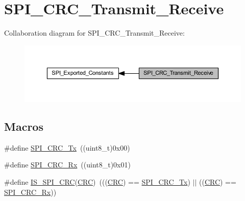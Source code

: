 \hypertarget{group___s_p_i___c_r_c___transmit___receive}{}\section{S\+P\+I\+\_\+\+C\+R\+C\+\_\+\+Transmit\+\_\+\+Receive}
\label{group___s_p_i___c_r_c___transmit___receive}
Collaboration diagram for S\+P\+I\+\_\+\+C\+R\+C\+\_\+\+Transmit\+\_\+\+Receive\+:
\nopagebreak
\begin{figure}[H]
\begin{center}
\leavevmode
\includegraphics[width=350pt]{group___s_p_i___c_r_c___transmit___receive}
\end{center}
\end{figure}
\subsection*{Macros}
\begin{DoxyCompactItemize}
\item 
\#define \hyperlink{group___s_p_i___c_r_c___transmit___receive_ga7b5cd97c9323e491b628fd3a7be9e133}{S\+P\+I\+\_\+\+C\+R\+C\+\_\+\+Tx}~((uint8\+\_\+t)0x00)
\item 
\#define \hyperlink{group___s_p_i___c_r_c___transmit___receive_gaf68380273616efbbc2dc9a420f1c641b}{S\+P\+I\+\_\+\+C\+R\+C\+\_\+\+Rx}~((uint8\+\_\+t)0x01)
\item 
\#define \hyperlink{group___s_p_i___c_r_c___transmit___receive_ga31fe242594f851558496a93f85def883}{I\+S\+\_\+\+S\+P\+I\+\_\+\+C\+RC}(\hyperlink{group___peripheral__declaration_ga4381bb54c2dbc34500521165aa7b89b1}{C\+RC})~(((\hyperlink{group___peripheral__declaration_ga4381bb54c2dbc34500521165aa7b89b1}{C\+RC}) == \hyperlink{group___s_p_i___c_r_c___transmit___receive_ga7b5cd97c9323e491b628fd3a7be9e133}{S\+P\+I\+\_\+\+C\+R\+C\+\_\+\+Tx}) $\vert$$\vert$ ((\hyperlink{group___peripheral__declaration_ga4381bb54c2dbc34500521165aa7b89b1}{C\+RC}) == \hyperlink{group___s_p_i___c_r_c___transmit___receive_gaf68380273616efbbc2dc9a420f1c641b}{S\+P\+I\+\_\+\+C\+R\+C\+\_\+\+Rx}))
\end{DoxyCompactItemize}


